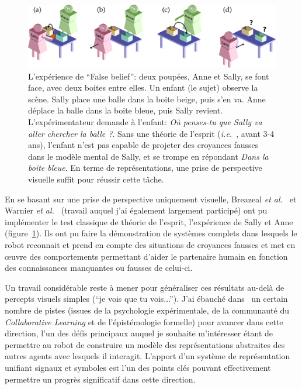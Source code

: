 \documentclass[a4paper]{article}
\newcommand{\etal}{{\textit{et al.~}}}
\newcommand{\ie}{{\textit{i.e.~}}}
\begin{document}
\begin{figure}[h!t]
        \centering
        \includegraphics[width=1.0\linewidth]{sally_ann}
        \caption{\small L'expérience de ``False belief'': deux poupées, Anne
            et Sally, se font face, avec deux boites entre elles. Un enfant
            (le sujet) observe la scène. Sally place une balle dans la boite
            beige, puis s'en va. Anne déplace la balle dans la boite bleue, puis
            Sally revient. L'expérimentateur demande à l'enfant: \emph{Où
            penses-tu que Sally va aller chercher la balle ?}. Sans une théorie
            de l'esprit (\ie, avant 3-4 ans), l'enfant n'est pas capable de
            projeter des croyances fausses dans le modèle mental de Sally, et se
            trompe en répondant \emph{Dans la boite bleue}. En terme de
            représentations, une prise de perspective visuelle suffit pour
            réussir cette tâche.}
        \label{false-beliefs}
\end{figure}

En se basant sur une prise de perspective uniquement visuelle, Breazeal
\etal\cite{breazeal2009embodied} et Warnier \etal\cite{warnier2012when} (travail
auquel j'ai également largement participé) ont pu implémenter le test classique de théorie de
l'esprit, l'expérience de Sally et Anne (figure~\ref{false-beliefs}). Ils ont pu
faire la démonstration de systèmes complets dans lesquels le robot reconnait et
prend en compte des situations de croyances fausses et met en \oe uvre des
comportements permettant d'aider le partenaire humain en fonction des
connaissances manquantes ou fausses de celui-ci.

Un travail considérable reste à mener pour généraliser ces résultats au-delà de
percepts visuels simples (``je vois que tu vois...'').  J'ai ébauché
dans~\cite{lemaignan2015mutual} un certain nombre de pistes (issues de la
psychologie expérimentale, de la communauté du \emph{Collaborative Learning} et
de l'épistémologie formelle) pour avancer dans cette direction, l'un des défis
principaux auquel je souhaite m'intéresser étant de permettre au robot de
construire un modèle des représentations abstraites des autres agents avec
lesquels il interagit.  L'apport d'un système de représentation unifiant signaux
et symboles est l'un des points clés pouvant effectivement permettre un progrès
significatif dans cette direction.
\end{document}
